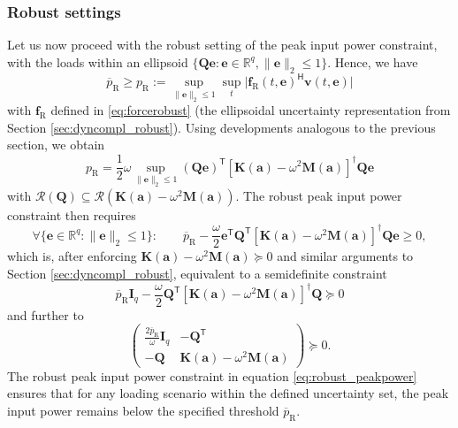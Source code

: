 \documentclass[preprint,3p]{elsarticle}
\newcommand{\T}{^{\mathsf T}}
\newcommand{\TC}{^{\mathsf H}}
\newcommand{\R}{\mathrm{R}}
\newcommand{\range}[1]{\ensuremath{\mathcal{R}\!\left(#1\right)}}
\numberwithin{equation}{section}
\begin{document}
\subsubsection{Robust settings}\label{sec:peakpower_robust}

Let us now proceed with the robust setting of the peak input power constraint, with the loads within an ellipsoid $\{\mathbf{Q}\mathbf{e}: \mathbf{e} \in \mathbb{R}^{q}, \lVert\mathbf{e}\rVert_2 \le 1\}$. Hence, we have
%
\begin{equation}
  \overline{p}_\R \ge p_\R := \sup_{\lVert \mathbf{e} \rVert_2 \le 1} \sup_{t} \lvert \mathbf{f}_\R (t, \mathbf{e})\TC \mathbf{v}(t, \mathbf{e})\rvert
\end{equation}
%
with $\mathbf{f}_\R$ defined in \eqref{eq:forcerobust} (the ellipsoidal uncertainty representation from Section \ref{sec:dyncompl_robust}). Using developments analogous to the previous section, we obtain
%
\begin{equation}
  p_\R = \frac{1}{2}\omega \sup_{\lVert\mathbf{e}\rVert_2 \le 1} \left(\mathbf{Q}\mathbf{e}\right)\T \left[ \mathbf{K}(\mathbf{a}) - \omega^2 \mathbf{M}(\mathbf{a})\right]^\dagger \mathbf{Q} \mathbf{e}
\end{equation}
%
with $\range{\mathbf{Q}} \subseteq \range{\mathbf{K}(\mathbf{a}) - \omega^2 \mathbf{M}(\mathbf{a})}$. The robust peak input power constraint then requires
%
\begin{equation}
  \forall \{\mathbf{e} \in \mathbb{R}^q: \lVert\mathbf{e}\rVert_2 \le 1\}: \qquad\overline{p}_\R - \frac{\omega}{2}\mathbf{e}\T\mathbf{Q}\T \left[ \mathbf{K}(\mathbf{a}) - \omega^2 \mathbf{M}(\mathbf{a})\right]^\dagger \mathbf{Q} \mathbf{e} \ge 0,
\end{equation}
%
which is, after enforcing $\mathbf{K}(\mathbf{a}) - \omega^2 \mathbf{M}(\mathbf{a})\succeq 0$ and similar arguments to Section \ref{sec:dyncompl_robust}, equivalent to a semidefinite constraint
%
\begin{equation}\label{eq:robust_peakpower_sphere}
  \overline{p}_\R \mathbf{I}_q - \frac{\omega}{2} \mathbf{Q}\T \left[ \mathbf{K}(\mathbf{a}) - \omega^2 \mathbf{M}(\mathbf{a})\right]^\dagger \mathbf{Q} \succeq 0
\end{equation}
%
and further to
%
\begin{equation}\label{eq:robust_peakpower}
  \begin{pmatrix}
    \frac{2 \overline{p}_\R}{\omega}\mathbf{I}_q & - \mathbf{Q}\T\\
    -\mathbf{Q} & \mathbf{K}(\mathbf{a}) - \omega^2 \mathbf{M}(\mathbf{a})
  \end{pmatrix} \succeq 0.
\end{equation}
%
The robust peak input power constraint in equation \eqref{eq:robust_peakpower} ensures that for any loading scenario within the defined uncertainty set, the peak input power remains below the specified threshold $\overline{p}_\R$.
\end{document}
